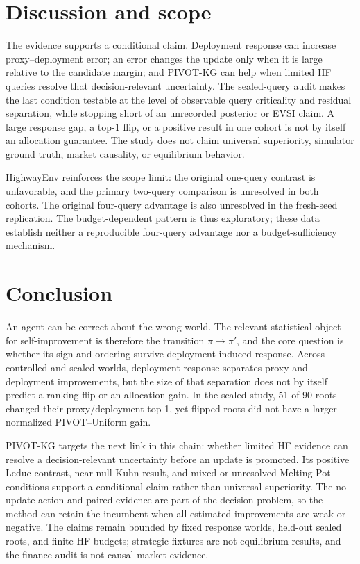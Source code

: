\documentclass{article}
\begin{document}
\section{Discussion and scope}
The evidence supports a conditional claim. Deployment response can increase
proxy--deployment error; an error changes the update only when it is large
relative to the candidate margin; and PIVOT-KG can help when limited HF queries
resolve that decision-relevant uncertainty. The sealed-query audit makes the
last condition testable at the level of observable query criticality and
residual separation, while stopping short of an unrecorded posterior or EVSI
claim. A large response gap, a top-1 flip, or a positive result in one cohort
is not by itself an allocation guarantee.
The study does not claim universal superiority, simulator ground truth, market
causality, or equilibrium behavior.

HighwayEnv reinforces the scope limit: the original one-query contrast is
unfavorable, and the primary two-query comparison is unresolved in both
cohorts. The original four-query advantage is also unresolved in the
fresh-seed replication. The budget-dependent pattern is thus exploratory;
these data establish neither a reproducible four-query advantage nor a
budget-sufficiency mechanism.

\section{Conclusion}
An agent can be correct about the wrong world. The relevant statistical object
for self-improvement is therefore the transition $\pi\to\pi'$, and the core
question is whether its sign and ordering survive deployment-induced response.
Across controlled and sealed worlds, deployment response separates proxy and
deployment improvements, but the size of that separation does not by itself
predict a ranking flip or an allocation gain. In the sealed study, 51 of 90
roots changed their proxy/deployment top-1, yet flipped roots did not have a
larger normalized PIVOT--Uniform gain.

PIVOT-KG targets the next link in this chain: whether limited HF evidence can
resolve a decision-relevant uncertainty before an update is promoted. Its
positive Leduc contrast, near-null Kuhn result, and mixed or unresolved Melting
Pot conditions support a conditional claim rather than universal superiority.
The no-update action and paired evidence are part of the decision problem, so
the method can retain the incumbent when all estimated improvements are weak or
negative. The claims remain bounded by fixed response worlds, held-out sealed
roots, and finite HF budgets; strategic fixtures are not equilibrium results,
and the finance audit is not causal market evidence.
\end{document}
